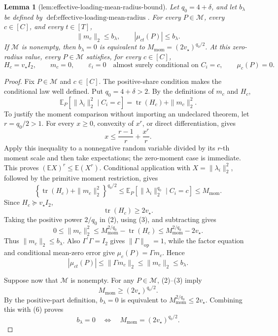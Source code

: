 \documentclass{article}
\newtheorem{lemma}{Lemma}
\begin{document}
\begin{lemma}[lem:effective-loading-mean-radius-bound]\label{lem:effective-loading-mean-radius-bound}
Let \(q_0=4+\delta\), and let \(b_\lambda\) be defined by \(\operatorname{def:effective\text{-}loading\text{-}mean\text{-}radius}\). For every \(P\in\mathcal M\), every \(c\in[C]\), and every \(t\in[T]\),
\[
\|m_c\|_2\leq b_\lambda,
\qquad
|\mu_{ct}(P)|\leq b_\lambda.
\]
If \(\mathcal M\) is nonempty, then \(b_\lambda=0\) is equivalent to \(M_{\mathrm{mom}}=(2v_\star)^{q_0/2}\). At this zero-radius value, every \(P\in\mathcal M\) satisfies, for every \(c\in[C]\),
\[
H_c=v_\star I_2,
\qquad
m_c=0,
\qquad
\varepsilon_i=0\quad\text{almost surely conditional on }C_i=c,
\qquad
\mu_c(P)=0.
\]
\end{lemma}
\begin{proof}
Fix \(P\in\mathcal M\) and \(c\in[C]\). The positive-share condition makes the conditional law well defined. Put \(q_0=4+\delta>2\). By the definitions of \(m_c\) and \(H_c\),
\[
\mathbb E_P[\|\lambda_i\|_2^2\mid C_i=c]
=\operatorname{tr}(H_c)+\|m_c\|_2^2.
\tag{1}
\]
To justify the moment comparison without importing an undeclared theorem, let \(r=q_0/2>1\). For every \(x\geq0\), convexity of \(x^r\), or direct differentiation, gives
\[
x\leq\frac{r-1}{r}+\frac{x^r}{r}.
\]
Apply this inequality to a nonnegative random variable divided by its \(r\)-th moment scale and then take expectations; the zero-moment case is immediate. This proves \((\mathbb EX)^r\leq\mathbb E(X^r)\). Conditional application with \(X=\|\lambda_i\|_2^2\), followed by the primitive moment restriction, gives
\[
\left\{\operatorname{tr}(H_c)+\|m_c\|_2^2\right\}^{q_0/2}
\leq\mathbb E_P[\|\lambda_i\|_2^{q_0}\mid C_i=c]
\leq M_{\mathrm{mom}}.
\tag{2}
\]
Since \(H_c\succeq v_\star I_2\),
\[
\operatorname{tr}(H_c)\geq2v_\star.
\tag{3}
\]
Taking the positive power \(2/q_0\) in (2), using (3), and subtracting gives
\[
0\leq\|m_c\|_2^2
\leq M_{\mathrm{mom}}^{2/q_0}-\operatorname{tr}(H_c)
\leq M_{\mathrm{mom}}^{2/q_0}-2v_\star.
\tag{4}
\]
Thus \(\|m_c\|_2\leq b_\lambda\). Also \(\Gamma^{\prime}\Gamma=I_2\) gives \(\|\Gamma\|_{\mathrm{op}}=1\), while the factor equation and conditional mean-zero error give \(\mu_c(P)=\Gamma m_c\). Hence
\[
|\mu_{ct}(P)|
\leq\|\Gamma m_c\|_2
\leq\|m_c\|_2
\leq b_\lambda.
\tag{5}
\]

Suppose now that \(\mathcal M\) is nonempty. For any \(P\in\mathcal M\), (2)--(3) imply
\[
M_{\mathrm{mom}}\geq(2v_\star)^{q_0/2}.
\tag{6}
\]
By the positive-part definition, \(b_\lambda=0\) is equivalent to \(M_{\mathrm{mom}}^{2/q_0}\leq2v_\star\). Combining this with (6) proves
\[
b_\lambda=0
\quad\Longleftrightarrow\quad
M_{\mathrm{mom}}=(2v_\star)^{q_0/2}.
\tag{7}
\]


\end{proof}
\end{document}

